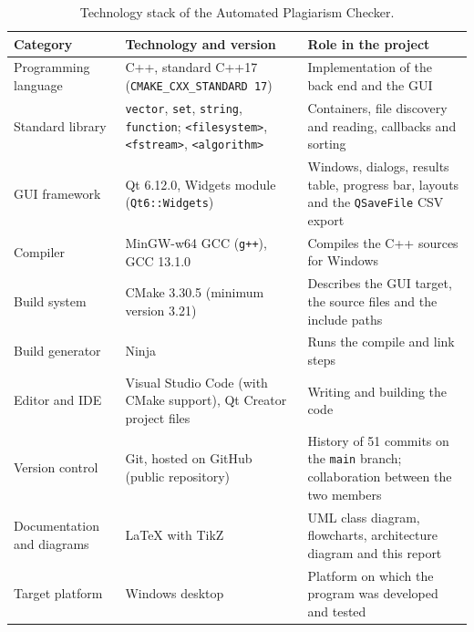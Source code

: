 \documentclass[11pt,a4paper]{report}
\newcommand{\cc}[1]{\texttt{#1}}
\begin{document}
\begin{table}[htbp]
\centering
\small
\begin{tabular}{@{}p{3.0cm} p{5.2cm} p{6.8cm}@{}}
\toprule
Category & Technology and version & Role in the project \\
\midrule
Programming language & C++, standard C++17 (\cc{CMAKE\_CXX\_STANDARD 17}) &
  Implementation of the back end and the GUI \\
Standard library & \cc{vector}, \cc{set}, \cc{string}, \cc{function}; \cc{<filesystem>},
  \cc{<fstream>}, \cc{<algorithm>} &
  Containers, file discovery and reading, callbacks and sorting \\
GUI framework & Qt 6.12.0, Widgets module (\cc{Qt6::Widgets}) &
  Windows, dialogs, results table, progress bar, layouts and the \cc{QSaveFile} CSV export \\
Compiler & MinGW-w64 GCC (\cc{g++}), GCC 13.1.0 & Compiles the C++ sources for Windows \\
Build system & CMake 3.30.5 (minimum version 3.21) &
  Describes the GUI target, the source files and the include paths \\
Build generator & Ninja & Runs the compile and link steps \\
Editor and IDE & Visual Studio Code (with CMake support), Qt Creator project files &
  Writing and building the code \\
Version control & Git, hosted on GitHub (public repository) &
  History of 51 commits on the \cc{main} branch; collaboration between the two members \\
Documentation and diagrams & \LaTeX{} with TikZ &
  UML class diagram, flowcharts, architecture diagram and this report \\
Target platform & Windows desktop &
  Platform on which the program was developed and tested \\
\bottomrule
\end{tabular}
\caption{Technology stack of the Automated Plagiarism Checker.}
\label{tab:stack}
\end{table}

\end{document}
